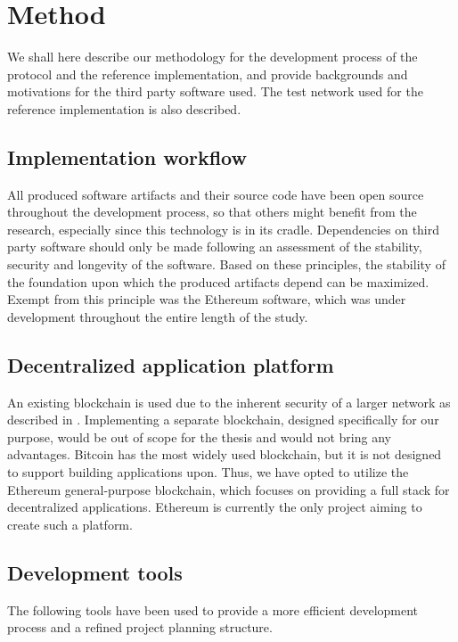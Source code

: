 \chapter{Method}
We shall here describe our methodology for the development process of the protocol and the reference implementation, and provide backgrounds and motivations for the third party software used. The test network used for the reference implementation is also described.

\section{Implementation workflow}
All produced software artifacts and their source code have been open source throughout the development process, so that others might benefit from the research, especially since this technology is in its cradle. Dependencies on third party software should only be made following an assessment of the stability, security and longevity of the software. Based on these principles, the stability of the foundation upon which the produced artifacts depend can be maximized. Exempt from this principle was the Ethereum software, which was under development throughout the entire length of the study. 

\section{Decentralized application platform}
An existing blockchain is used due to the inherent security of a larger network as described in . Implementing a separate blockchain, designed specifically for our purpose, would be out of scope for the thesis and would not bring any advantages. Bitcoin has the most widely used blockchain, but it is not designed to support building applications upon. Thus, we have opted to utilize the Ethereum general-purpose blockchain, which focuses on providing a full stack for decentralized applications. Ethereum is currently the only project aiming to create such a platform.

\section{Development tools}
The following tools have been used to provide a more efficient development process and a refined project planning structure.


